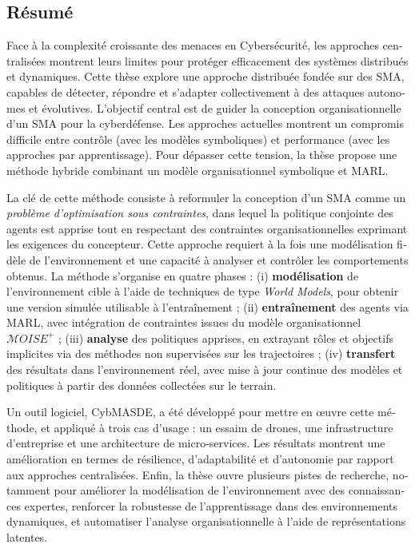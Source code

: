 \renewcommand{\abstractname}{Abstract}
\begingroup
\let\clearpage\relax
\let\cleardoublepage\relax
\let\cleardoublepage\relax

\begin{otherlanguage}{ngerman}
    \chapter*{Résumé}

    Face à la complexité croissante des menaces en Cybersécurité, les approches centralisées montrent leurs limites pour protéger efficacement des systèmes distribués et dynamiques. Cette thèse explore une approche distribuée fondée sur des \ac{SMA}, capables de détecter, répondre et s'adapter collectivement à des attaques autonomes et évolutives.
    L'objectif central est de guider la conception organisationnelle d'un SMA pour la cyberdéfense. Les approches actuelles montrent un compromis difficile entre contrôle (avec les modèles symboliques) et performance (avec les approches par apprentissage). Pour dépasser cette tension, la thèse propose une méthode hybride combinant un modèle organisationnel symbolique et \ac{MARL}.

    La clé de cette méthode consiste à reformuler la conception d'un SMA comme un \textit{problème d'optimisation sous contraintes}, dans lequel la politique conjointe des agents est apprise tout en respectant des contraintes organisationnelles exprimant les exigences du concepteur. Cette approche requiert à la fois une modélisation fidèle de l'environn\-ement et une capacité à analyser et contrôler les comportements obtenus.
    La méthode s'organise en quatre phases : (i) \textbf{modélisation} de l'environnement cible à l'aide de techniques de type \textit{World Models}, pour obtenir une version simulée utilisable à l'entraînement ; (ii) \textbf{entraînement} des agents via MARL, avec intégration de contraintes issues du modèle organisationnel $\mathcal{M}OISE^+$ ; (iii) \textbf{analyse} des politiques apprises, en extrayant rôles et objectifs implicites via des méthodes non supervisées sur les trajectoires ; (iv) \textbf{transfert} des résultats dans l'environnement réel, avec mise à jour continue des modèles et politiques à partir des données collectées sur le terrain.

    Un outil logiciel, CybMASDE, a été développé pour mettre en œuvre cette méthode, et appliqué à trois cas d'usage : un essaim de drones, une infrastructure d'entreprise et une architecture de micro-services. Les résultats montrent une amélioration en termes de résilience, d'adaptabilité et d'autonomie par rapport aux approches centralisées.
    Enfin, la thèse ouvre plusieurs pistes de recherche, notamment pour améliorer la modélisation de l'environnement avec des connaissances expertes, renforcer la robustesse de l'apprentissage dans des environnements dynamiques, et automatiser l'analyse organisationnelle à l'aide de représentations latentes.


\end{otherlanguage}
